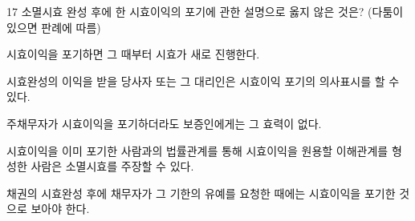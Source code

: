 \begin{question}{17}
소멸시효 완성 후에 한 시효이익의 포기에 관한 설명으로 옳지 않은 것은? (다툼이 있으면 판례에 따름)
\begin{choices}
  \item 시효이익을 포기하면 그 때부터 시효가 새로 진행한다.
  \item 시효완성의 이익을 받을 당사자 또는 그 대리인은 시효이익 포기의 의사표시를 할 수 있다.
  \item 주채무자가 시효이익을 포기하더라도 보증인에게는 그 효력이 없다.
  \item 시효이익을 이미 포기한 사람과의 법률관계를 통해 시효이익을 원용할 이해관계를 형성한 사람은 소멸시효를 주장할 수 있다.
  \item 채권의 시효완성 후에 채무자가 그 기한의 유예를 요청한 때에는 시효이익을 포기한 것으로 보아야 한다.
\end{choices}
\end{question}
